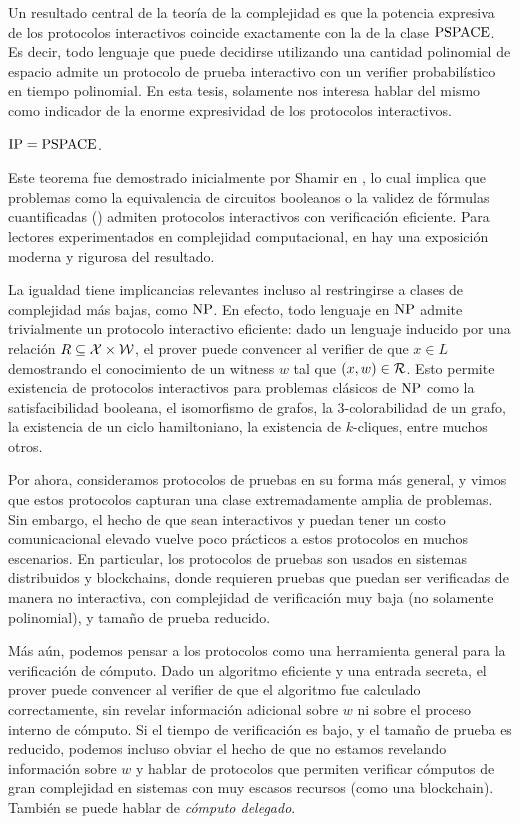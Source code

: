 Un resultado central de la teoría de la complejidad es que la potencia expresiva de los protocolos interactivos coincide exactamente con la de la clase $\mathrm{PSPACE}$. Es decir, todo lenguaje que puede decidirse utilizando una cantidad polinomial de espacio admite un protocolo de prueba interactivo con un verifier probabilístico en tiempo polinomial. En esta tesis, solamente nos interesa hablar del mismo como indicador de la enorme expresividad de los protocolos interactivos.

\begin{theorem}
	$\mathrm{IP} = \mathrm{PSPACE}$.
\end{theorem}

Este teorema fue demostrado inicialmente por Shamir en \cite{Shamir1992}, lo cual implica que problemas como la equivalencia de circuitos booleanos o la validez de fórmulas cuantificadas (\QBF) admiten protocolos interactivos con verificación eficiente. Para lectores experimentados en complejidad computacional, en \cite{arora2006computational} hay una exposición moderna y rigurosa del resultado.

La igualdad tiene implicancias relevantes incluso al restringirse a clases de complejidad más bajas, como $\mathrm{NP}$. En efecto, todo lenguaje en $\mathrm{NP}$ admite trivialmente un protocolo interactivo eficiente: dado un lenguaje inducido por una relación $R \subseteq \mathcal{X} \times \mathcal{W}$, el prover puede convencer al verifier de que $x \in L$ demostrando el conocimiento de un witness $w$ tal que $(x,w) \in \mathcal{R}$. Esto permite existencia de protocolos interactivos para problemas clásicos de $\mathrm{NP}$ como la satisfacibilidad booleana, el isomorfismo de grafos, la 3-colorabilidad de un grafo, la existencia de un ciclo hamiltoniano, la existencia de $k$-cliques, entre muchos otros.

Por ahora, consideramos protocolos de pruebas \ZK en su forma más general, y vimos que estos protocolos capturan una clase extremadamente amplia de problemas. Sin embargo, el hecho de que sean interactivos y puedan tener un costo comunicacional elevado vuelve poco prácticos a estos protocolos en muchos escenarios. En particular, los protocolos de pruebas \ZK son usados en sistemas distribuidos y blockchains, donde requieren pruebas que puedan ser verificadas de manera no interactiva, con complejidad de verificación muy baja (no solamente polinomial), y tamaño de prueba reducido.

Más aún, podemos pensar a los protocolos \ZK como una herramienta general para la verificación de cómputo. Dado un algoritmo eficiente y una entrada secreta, el prover puede convencer al verifier de que el algoritmo fue calculado correctamente, sin revelar información adicional sobre $w$ ni sobre el proceso interno de cómputo. Si el tiempo de verificación es bajo, y el tamaño de prueba es reducido, podemos incluso obviar el hecho de que no estamos revelando información sobre $w$ y hablar de protocolos \ZK que permiten verificar cómputos de gran complejidad en sistemas con muy escasos recursos (como una blockchain). También se puede hablar de \textit{cómputo delegado}.

